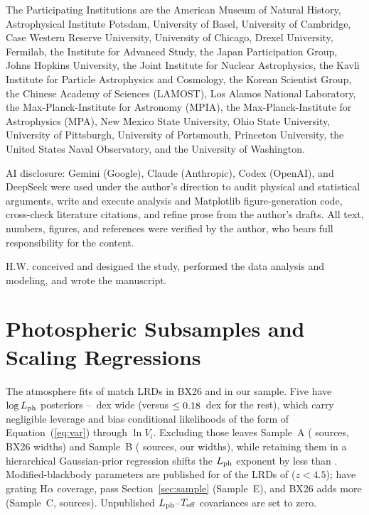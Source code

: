 \documentclass[twocolumn,linenumbers]{aastex701}
\newcommand{\Ha}{H$\alpha$}
\newcommand{\Lph}{L_{\rm ph}}
\newcommand{\Teff}{T_{\rm eff}}
\newcommand{\BX}{BX26}
\begin{document}
\begin{acknowledgments}
The Participating Institutions are the American Museum of Natural History, Astrophysical Institute Potsdam, University of Basel, University of Cambridge, Case Western Reserve University, University of Chicago, Drexel University, Fermilab, the Institute for Advanced Study, the Japan Participation Group, Johns Hopkins University, the Joint Institute for Nuclear Astrophysics, the Kavli Institute for Particle Astrophysics and Cosmology, the Korean Scientist Group, the Chinese Academy of Sciences (LAMOST), Los Alamos National Laboratory, the Max-Planck-Institute for Astronomy (MPIA), the Max-Planck-Institute for Astrophysics (MPA), New Mexico State University, Ohio State University, University of Pittsburgh, University of Portsmouth, Princeton University, the United States Naval Observatory, and the University of Washington.

AI disclosure: Gemini (Google), Claude (Anthropic), Codex (OpenAI), and DeepSeek were used under the author's direction to audit physical and statistical arguments, write and execute analysis and Matplotlib figure-generation code, cross-check literature citations, and refine prose from the author's drafts. All text, numbers, figures, and references were verified by the author, who bears full responsibility for the content.
\end{acknowledgments}

\begin{contribution}
H.W. conceived and designed the study, performed the data analysis and modeling, and wrote the manuscript.
\end{contribution}



\clearpage
\restartappendixnumbering
\appendix
\twocolumngrid

\section{Photospheric Subsamples and Scaling Regressions} \label{app:scaling}

The atmosphere fits of \citet{Curtis2026} match \NPAall{} LRDs in \BX{} and \NPBall{} in our sample.
Five have $\log\Lph$ posteriors \sxDropMin{}--\sxDropMax{}~dex wide (versus $\leq0.18{}$~dex for the rest), which carry negligible leverage and bias conditional likelihoods of the form of Equation~(\ref{eq:var}) through $\ln V_i$.
Excluding those \NPdrop{} leaves Sample~A (\NPA{} sources, \BX{} widths) and Sample~B (\NPB{} sources, our widths), while retaining them in a hierarchical Gaussian-prior regression shifts the $\Lph$ exponent by less than \hierDb{}.
Modified-blackbody parameters are published for \NdGbb{} of the \NdGall{} LRDs of \citet{deGraaff2026} ($z<4.5$); \NdGfit{} have grating \Ha{} coverage, \NPE{} pass Section~\ref{sec:sample} (Sample~E), and \BX{} adds \NPCbx{} more (Sample~C, \NPC{} sources).
Unpublished $\Lph$--$\Teff$ covariances are set to zero.
\end{document}
